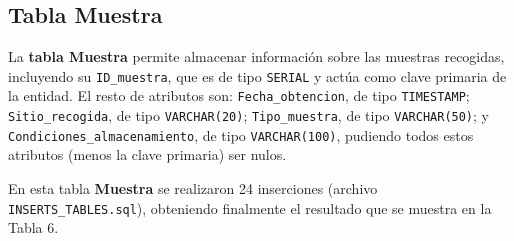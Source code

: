 \documentclass[spanish]{article}
\begin{document}
\subsection{Tabla Muestra}

La \textbf{tabla Muestra} permite almacenar información sobre las muestras recogidas, incluyendo su \texttt{ID\_muestra}, que es de tipo \texttt{SERIAL} y actúa como clave primaria de la entidad. El resto de atributos son: \texttt{Fecha\_obtencion}, de tipo \texttt{TIMESTAMP}; \texttt{Sitio\_recogida}, de tipo \texttt{VARCHAR(20)}; \texttt{Tipo\_muestra}, de tipo \texttt{VARCHAR(50)}; y \texttt{Condiciones\_almacenamiento}, de tipo \texttt{VARCHAR(100)}, pudiendo todos estos atributos (menos la clave primaria) ser nulos.

En esta tabla \textbf{Muestra} se realizaron 24 inserciones (archivo \texttt{INSERTS\_TABLES.sql}), obteniendo finalmente el resultado que se muestra en la Tabla 6.
\end{document}
